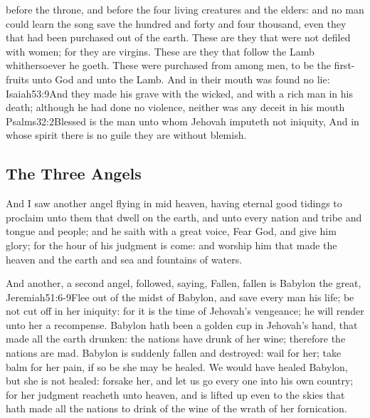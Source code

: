  before the throne, and before the four living creatures and the elders: and no man could learn the song save the hundred and forty and four thousand, even they that had been purchased out of the earth. 
 These are they that were not defiled with women; for they are virgins. These are they that follow the Lamb whithersoever he goeth. These were purchased from among men, to be the first-fruits unto God and unto the Lamb. 
 And in their mouth was found no lie:%
				   {Isaiah}{53:9}{And they made his grave with the wicked, and with a rich man in his death; although he had done no violence, neither was any deceit in his mouth}%
				   {Psalms}{32:2}{Blessed is the man unto whom Jehovah imputeth not iniquity,
And in whose spirit there is no guile}
 they are without blemish.
\subsection*{The Three Angels}
 And I saw another angel flying in mid heaven, having eternal good tidings to proclaim unto them that dwell on the earth, and unto every nation and tribe and tongue and people; 
 and he saith with a great voice, Fear God, and give him glory; for the hour of his judgment is come: and worship him that made the heaven and the earth and sea and fountains of waters.

 And another, a second angel, followed, saying, Fallen, fallen is Babylon the great,%
				  {Jeremiah}{51:6-9}{Flee out of the midst of Babylon, and save every man his life; be not cut off in her iniquity: for it is the time of Jehovah’s vengeance; he will render unto her a recompense. Babylon hath been a golden cup in Jehovah’s hand, that made all the earth drunken: the nations have drunk of her wine; therefore the nations are mad. Babylon is suddenly fallen and destroyed: wail for her; take balm for her pain, if so be she may be healed. We would have healed Babylon, but she is not healed: forsake her, and let us go every one into his own country; for her judgment reacheth unto heaven, and is lifted up even to the skies}
 that hath made all the nations to drink of the wine of the wrath of her fornication.

